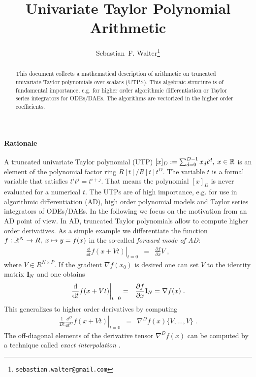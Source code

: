 \documentclass[a4paper,12pt,twoside]{article}
\title{Univariate Taylor Polynomial Arithmetic}
\author{Sebastian~F. Walter\footnote{\texttt{sebastian.walter@gmail.com}}}
\begin{document}
\maketitle

\begin{abstract}
This document collects a mathematical description of arithmetic on truncated univariate Taylor polynomials over scalars (UTPS). This algebraic structure is of fundamental importance, e.g. for higher order algorithmic differentiation or Taylor series integrators for ODEs/DAEs. The algorithms are vectorized in the higher order coefficients.
\end{abstract}
\paragraph{Rationale}
A truncated univariate Taylor polynomial (UTP) $[x]_D := \sum_{d=0}^{D-1} x_d t^d,\; x \in {\mathbb R}$ is an element of the polynomial factor ring $R[t]/R[t] t^D$. The variable $t$ is a formal variable that satisfies $t^i t^j = t^{i+j}$. That means the polynomial $[x]_D$ is never evaluated for a numerical $t$. The UTPs are of high importance, e.g. for use in algorithmic differentiation (AD), high order polynomial models and Taylor series integrators of ODEs/DAEs. In the following we focus on the motivation from an AD point of view.
In AD, truncated Taylor polynomials allow to compute higher order derivatives. As a simple example we differentiate the function $f: {\mathbb R}^N \rightarrow R, \; x \mapsto y = f(x)$ in the so-called \emph{forward mode of AD}:
\begin{eqnarray}
\left. \frac{\dd}{\dd t} f( x + V t) \right|_{t=0} &=& \frac{\partial f}{\partial x} V \;,
\end{eqnarray}
where $V \in R^{N \times P}$. If the gradient $\nabla f(x_0)$ is desired one can set $V$ to the identity matrix $1 \!\!\! \mathrm I_N$ and one obtains 
\begin{eqnarray}
 \left. \frac{{\rm d}}{{\rm d} t} f( x + V t) \right|_{t=0} &=& \frac{\partial f}{\partial x} 1 \!\!\! \mathrm I_N = \nabla f(x)\;.
\end{eqnarray}
This generalizes to higher order derivatives by computing 
\begin{eqnarray}
\left. \frac{1}{D!}\frac{\dd^D}{\dd t^D} f(x + Vt) \right|_{t=0} &=& \nabla^D f(x) \{ V,\dots, V \} \;.
\end{eqnarray}
The off-diagonal elements of the derivative tensor $\nabla^D f(x)$ can be computed by a technique called \emph{exact interpolation} \cite{Griewank2008EDP}.
\end{document}
